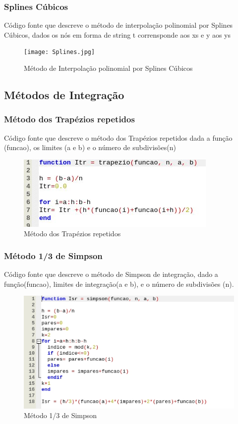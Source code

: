 \documentclass{article}
\begin{document}
		\subsubsection{Splines C\'ubicos}
		C\'odigo fonte que descreve o m\'etodo de interpolação polinomial por Splines C\'ubicos, dados os n\'os em forma de string t corrensponde aos xs e 
		y aos ys
			\begin{figure}[h!]
			\texttt{[image: Splines.jpg]}
			\caption{M\'etodo de Interpola\c c\~ao polinomial por Splines C\'ubicos}
			\end{figure}
\newpage
\subsection{M\'etodos de Integra\c c\~ao}
		\subsubsection{M\'etodo dos Trap\'ezios repetidos}
		C\'odigo fonte que descreve o m\'etodo dos Trap\'ezios repetidos dada a fun\c c\~ao (funcao), os limites (a e b) e o n\'umero de 
		subdivis\~oes(n)
			\begin{figure}[h!]
			\includegraphics[width=\linewidth]{Trapezio.jpg}
			\caption{M\'etodo dos Trap\'ezios repetidos}
			\end{figure}
\newpage
		\subsubsection{M\'etodo 1/3 de Simpson}
		C\'odigo fonte que descreve o m\'etodo de Simpson de integração, dado a fun\c c\~ao(funcao), limites de integra\c c\~ao(a e b), 
		e o n\'umero de subdivis\~oes (n).
			\begin{figure}[h!]
			\includegraphics[width=\linewidth]{Simpson.jpg}
			\caption{M\'etodo 1/3 de Simpson}
			\end{figure}
\newpage
\end{document}
